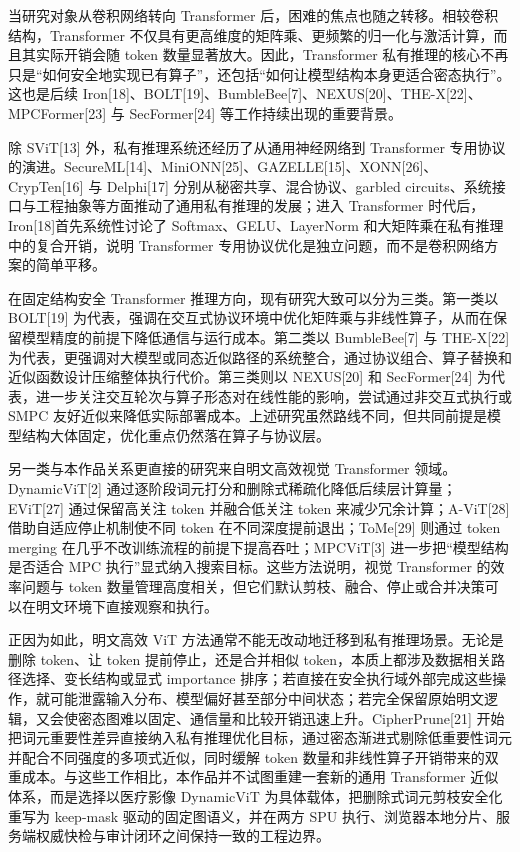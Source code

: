 当研究对象从卷积网络转向 Transformer 后，困难的焦点也随之转移。相较卷积结构，Transformer 不仅具有更高维度的矩阵乘、更频繁的归一化与激活计算，而且其实际开销会随 token 数量显著放大。因此，Transformer 私有推理的核心不再只是“如何安全地实现已有算子”，还包括“如何让模型结构本身更适合密态执行”。这也是后续 Iron[18]、BOLT[19]、BumbleBee[7]、NEXUS[20]、THE-X[22]、MPCFormer[23] 与 SecFormer[24] 等工作持续出现的重要背景。

除 SViT[13] 外，私有推理系统还经历了从通用神经网络到 Transformer 专用协议的演进。SecureML[14]、MiniONN[25]、GAZELLE[15]、XONN[26]、CrypTen[16] 与 Delphi[17] 分别从秘密共享、混合协议、garbled circuits、系统接口与工程抽象等方面推动了通用私有推理的发展；进入 Transformer 时代后，Iron[18]首先系统性讨论了 Softmax、GELU、LayerNorm 和大矩阵乘在私有推理中的复合开销，说明 Transformer 专用协议优化是独立问题，而不是卷积网络方案的简单平移。

在固定结构安全 Transformer 推理方向，现有研究大致可以分为三类。第一类以 BOLT[19] 为代表，强调在交互式协议环境中优化矩阵乘与非线性算子，从而在保留模型精度的前提下降低通信与运行成本。第二类以 BumbleBee[7] 与 THE-X[22] 为代表，更强调对大模型或同态近似路径的系统整合，通过协议组合、算子替换和近似函数设计压缩整体执行代价。第三类则以 NEXUS[20] 和 SecFormer[24] 为代表，进一步关注交互轮次与算子形态对在线性能的影响，尝试通过非交互式执行或 SMPC 友好近似来降低实际部署成本。上述研究虽然路线不同，但共同前提是模型结构大体固定，优化重点仍然落在算子与协议层。

另一类与本作品关系更直接的研究来自明文高效视觉 Transformer 领域。DynamicViT[2] 通过逐阶段词元打分和删除式稀疏化降低后续层计算量；EViT[27] 通过保留高关注 token 并融合低关注 token 来减少冗余计算；A-ViT[28] 借助自适应停止机制使不同 token 在不同深度提前退出；ToMe[29] 则通过 token merging 在几乎不改训练流程的前提下提高吞吐；MPCViT[3] 进一步把“模型结构是否适合 MPC 执行”显式纳入搜索目标。这些方法说明，视觉 Transformer 的效率问题与 token 数量管理高度相关，但它们默认剪枝、融合、停止或合并决策可以在明文环境下直接观察和执行。

正因为如此，明文高效 ViT 方法通常不能无改动地迁移到私有推理场景。无论是删除 token、让 token 提前停止，还是合并相似 token，本质上都涉及数据相关路径选择、变长结构或显式 importance 排序；若直接在安全执行域外部完成这些操作，就可能泄露输入分布、模型偏好甚至部分中间状态；若完全保留原始明文逻辑，又会使密态图难以固定、通信量和比较开销迅速上升。CipherPrune[21] 开始把词元重要性差异直接纳入私有推理优化目标，通过密态渐进式剔除低重要性词元并配合不同强度的多项式近似，同时缓解 token 数量和非线性算子开销带来的双重成本。与这些工作相比，本作品并不试图重建一套新的通用 Transformer 近似体系，而是选择以医疗影像 DynamicViT 为具体载体，把删除式词元剪枝安全化重写为 keep-mask 驱动的固定图语义，并在两方 SPU 执行、浏览器本地分片、服务端权威快检与审计闭环之间保持一致的工程边界。

